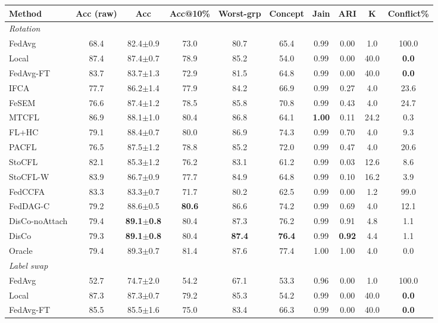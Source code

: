\scriptsize
\setlength{\tabcolsep}{3.2pt}
\begin{tabular}{lccccccccc}
\toprule
Method & Acc (raw) & Acc & Acc@10\% & Worst-grp & Concept & Jain & ARI & K & Conflict\% \\
\midrule
\multicolumn{10}{l}{\textit{Rotation}}\\
FedAvg & 68.4 & 82.4$\pm$0.9 & 73.0 & 80.7 & 65.4 & 0.99 & 0.00 & 1.0 & 100.0 \\
Local & 87.4 & 87.4$\pm$0.7 & 78.9 & 85.2 & 54.0 & 0.99 & 0.00 & 40.0 & \textbf{0.0} \\
FedAvg-FT & 83.7 & 83.7$\pm$1.3 & 72.9 & 81.5 & 64.8 & 0.99 & 0.00 & 40.0 & \textbf{0.0} \\
IFCA & 77.7 & 86.2$\pm$1.4 & 77.9 & 84.2 & 66.9 & 0.99 & 0.27 & 4.0 & 23.6 \\
FeSEM & 76.6 & 87.4$\pm$1.2 & 78.5 & 85.8 & 70.8 & 0.99 & 0.43 & 4.0 & 24.7 \\
MTCFL & 86.9 & 88.1$\pm$1.0 & 80.4 & 86.8 & 64.1 & \textbf{1.00} & 0.11 & 24.2 & 0.3 \\
FL+HC & 79.1 & 88.4$\pm$0.7 & 80.0 & 86.9 & 74.3 & 0.99 & 0.70 & 4.0 & 9.3 \\
PACFL & 76.5 & 87.5$\pm$1.2 & 78.8 & 85.2 & 72.0 & 0.99 & 0.47 & 4.0 & 20.6 \\
StoCFL & 82.1 & 85.3$\pm$1.2 & 76.2 & 83.1 & 61.2 & 0.99 & 0.03 & 12.6 & 8.6 \\
StoCFL-W & 83.9 & 86.7$\pm$0.9 & 77.7 & 84.9 & 64.8 & 0.99 & 0.10 & 16.2 & 3.9 \\
FedCCFA & 83.3 & 83.3$\pm$0.7 & 71.7 & 80.2 & 62.5 & 0.99 & 0.00 & 1.2 & 99.0 \\
FedDAG-C & 79.2 & 88.6$\pm$0.5 & \textbf{80.6} & 86.6 & 74.2 & 0.99 & 0.69 & 4.0 & 12.1 \\
DisCo-noAttach & 79.4 & \textbf{89.1$\pm$0.8} & 80.4 & 87.3 & 76.2 & 0.99 & 0.91 & 4.8 & 1.1 \\
DisCo & 79.3 & \textbf{89.1$\pm$0.8} & 80.4 & \textbf{87.4} & \textbf{76.4} & 0.99 & \textbf{0.92} & 4.4 & 1.1 \\
Oracle & 79.4 & 89.3$\pm$0.7 & 81.4 & 87.6 & 77.4 & 1.00 & 1.00 & 4.0 & 0.0 \\
\midrule
\multicolumn{10}{l}{\textit{Label swap}}\\
FedAvg & 52.7 & 74.7$\pm$2.0 & 54.2 & 67.1 & 53.3 & 0.96 & 0.00 & 1.0 & 100.0 \\
Local & 87.3 & 87.3$\pm$0.7 & 79.2 & 85.3 & 54.2 & 0.99 & 0.00 & 40.0 & \textbf{0.0} \\
FedAvg-FT & 85.5 & 85.5$\pm$1.6 & 75.0 & 83.4 & 66.3 & 0.99 & 0.00 & 40.0 & \textbf{0.0} \\

\end{tabular}
